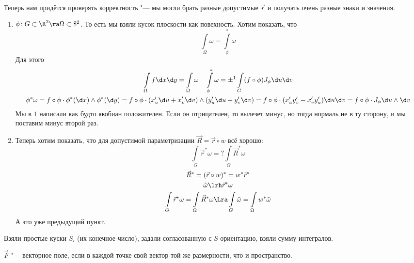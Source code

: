 \begin{Rem}
	Теперь нам придётся проверять корректность "--- мы могли брать разные допустимые $\vec r$ и получать очень разные знаки и значения.
\end{Rem}

\begin{theorem}
	\begin{enumerate}
	\item
		$\phi\colon G \subset \R^2 \ra \Omega \subset \$^2$.
		То есть мы взяли кусок плоскости как повехность.
		Хотим показать, что
		\[ \int\limits_\Omega \omega = \int\limits_\phi^* \omega\]
		Для этого
		\begin{gather*}
			\int\limits_\Omega f \d x \d y = \int\limits_\Omega \omega \quad
			\int\limits_\phi^* \omega = \pm^1 \int\limits_G (f \circ \phi) J_\phi \d u \d v \\
			\phi^* \omega = f \circ \phi \cdot \phi^*(\d x) \wedge \phi^*(\d y)
			= f \circ \phi \cdot (x_u' \d u + x_v' \d v) \wedge (y_u' \d u + y_v' \d v)
			= f \circ \phi \cdot (x_u' y_v' - x_v' y_u') \d u \d v
			= f \circ \phi \cdot J_\phi \d u \wedge \d v
		\end{gather*}
		Мы в $1$ написали как будто якобиан положителен.
		Если он отрицателен, то вылезет минус, но тогда нормаль не в ту сторону, и мы поставим минус второй раз.

	\item
		Теперь хотим показать, что для допустимой параметризации $\vec R = \vec r \circ w$ всё хорошо:
		\[ \int\limits_G \vec r^* \omega =? \int\limits_\Omega \vec R^* \omega \]
		\begin{gather*}
			\vec R^* = (\vec r \circ w)^* = w^* \vec r^* \\
			\tilde \omega \lrh \vec r^* \omega \\
			\int\limits_G \vec r^* \omega = \int\limits_\Omega \vec R^* \omega \Lra
			\int\limits_G \tilde \omega = \int\limits_\Omega w^* \tilde \omega
		\end{gather*}
		А это уже предыдущий пункт.
	\end{enumerate}
\end{theorem}

\begin{Def}
	Взяли простые куски $S_i$ (их конечное число), задали согласованную с $S$ ориентацию, взяли сумму интегралов.
\end{Def}

\begin{Def}
	$\vec F$ "--- векторное поле, если в каждой точке свой вектор той же размерности, что и пространство.
\end{Def}

